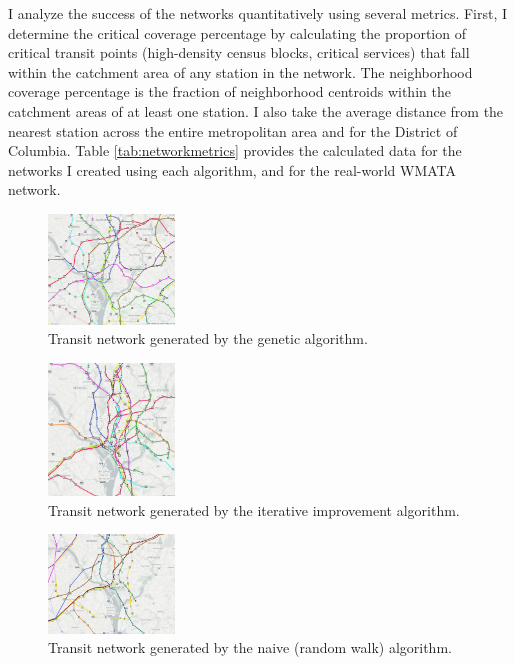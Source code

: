\documentclass[sigconf,nonacm]{acmart}
\begin{document}
I analyze the success of the networks quantitatively using several metrics. First, I determine the critical coverage percentage by calculating the proportion of critical transit points (high-density census blocks, critical services) that fall within the catchment area of any station in the network. The neighborhood coverage percentage is the fraction of neighborhood centroids within the catchment areas of at least one station. I also take the average distance from the nearest station across the entire metropolitan area and for the District of Columbia. Table \ref{tab:networkmetrics} provides the calculated data for the networks I created using each algorithm, and for the real-world WMATA network.

\begin{figure}[h]
    \centering
    \includegraphics[width=0.3\textwidth]{./img/gen.png}
    \caption{Transit network generated by the genetic algorithm.}
    \label{fig:genetic_network}
\end{figure}

\begin{figure}[h]
    \centering
    \includegraphics[width=0.3\textwidth]{./img/iter.png}
    \caption{Transit network generated by the iterative improvement algorithm.}
    \label{fig:iterative_network}
\end{figure}

\begin{figure}[h]
    \centering
    \includegraphics[width=0.3\textwidth]{./img/naive.png}
    \caption{Transit network generated by the naive (random walk) algorithm.}
    \label{fig:naive_network}
\end{figure}
\end{document}
